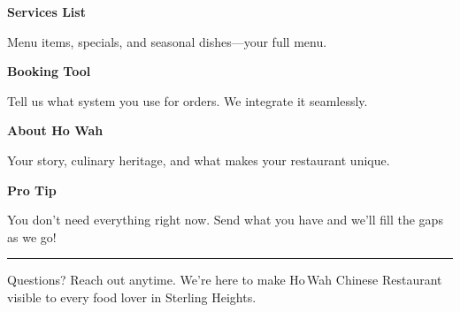 \documentclass[11pt,letterpaper]{article}
\begin{document}
\begin{minipage}[t]{0.48\textwidth}
\begin{tcolorbox}[colframe=accent-teal, boxrule=1pt, left=0.7em, right=0.7em, top=0.5em, bottom=0.5em, arc=4pt, boxsep=0pt]
{\bfseries\small\color{accent-teal}Services List}

\vspace{0.15em}

{\small Menu items, specials, and seasonal dishes—your full menu.}
\end{tcolorbox}

\vspace{0.1em}

\begin{tcolorbox}[colframe=accent-teal, boxrule=1pt, left=0.7em, right=0.7em, top=0.5em, bottom=0.5em, arc=4pt, boxsep=0pt]
{\bfseries\small\color{accent-teal}Booking Tool}

\vspace{0.15em}

{\small Tell us what system you use for orders. We integrate it seamlessly.}
\end{tcolorbox}

\vspace{0.1em}

\begin{tcolorbox}[colframe=accent-teal, boxrule=1pt, left=0.7em, right=0.7em, top=0.5em, bottom=0.5em, arc=4pt, boxsep=0pt]
{\bfseries\small\color{accent-teal}About Ho Wah}

\vspace{0.15em}

{\small Your story, culinary heritage, and what makes your restaurant unique.}
\end{tcolorbox}

\vspace{-0.2em}
\end{minipage}

\vspace{0.15em}

\begin{tcolorbox}[colback={accent-red!5}, colframe=accent-red!20, boxrule=0.5pt, left=0.7em, right=0.7em, top=0.4em, bottom=0.4em, arc=6pt, boxsep=0pt]

{\bfseries\small\color{accent-red}Pro Tip}

\vspace{0.1em}

{\small You don't need everything right now. Send what you have and we'll fill the gaps as we go!}

\end{tcolorbox}

\vspace{0.15em}

\noindent\hrule
\vspace{0.2em}

{\small\color{text-light}Questions? Reach out anytime. We're here to make Ho Wah Chinese Restaurant visible to every food lover in Sterling Heights.}
\end{document}
